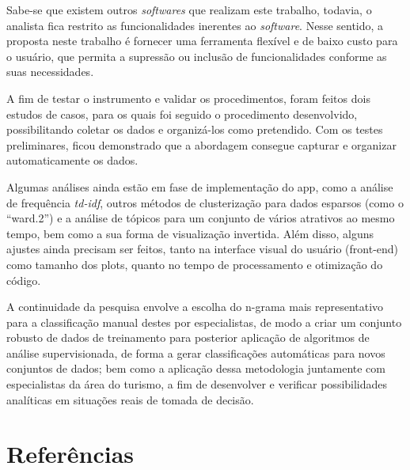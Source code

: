 \documentclass[preprint, 3p,
authoryear]{elsarticle} %
\begin{document}
Sabe-se que existem outros \emph{softwares} que realizam este trabalho,
todavia, o analista fica restrito as funcionalidades inerentes ao
\emph{software}. Nesse sentido, a proposta neste trabalho é fornecer uma
ferramenta flexível e de baixo custo para o usuário, que permita a
supressão ou inclusão de funcionalidades conforme as suas necessidades.

A fim de testar o instrumento e validar os procedimentos, foram feitos
dois estudos de casos, para os quais foi seguido o procedimento
desenvolvido, possibilitando coletar os dados e organizá-los como
pretendido. Com os testes preliminares, ficou demonstrado que a
abordagem consegue capturar e organizar automaticamente os dados.

Algumas análises ainda estão em fase de implementação do app, como a
análise de frequência \emph{td-idf}, outros métodos de clusterização
para dados esparsos (como o ``ward.2'') e a análise de tópicos para um
conjunto de vários atrativos ao mesmo tempo, bem como a sua forma de
visualização invertida. Além disso, alguns ajustes ainda precisam ser
feitos, tanto na interface visual do usuário (front-end) como tamanho
dos plots, quanto no tempo de processamento e otimização do código.

A continuidade da pesquisa envolve a escolha do n-grama mais
representativo para a classificação manual destes por especialistas, de
modo a criar um conjunto robusto de dados de treinamento para posterior
aplicação de algoritmos de análise supervisionada, de forma a gerar
classificações automáticas para novos conjuntos de dados; bem como a
aplicação dessa metodologia juntamente com especialistas da área do
turismo, a fim de desenvolver e verificar possibilidades analíticas em
situações reais de tomada de decisão.

\hypertarget{referuxeancias}{%
\section*{Referências}\label{referuxeancias}}
\end{document}
